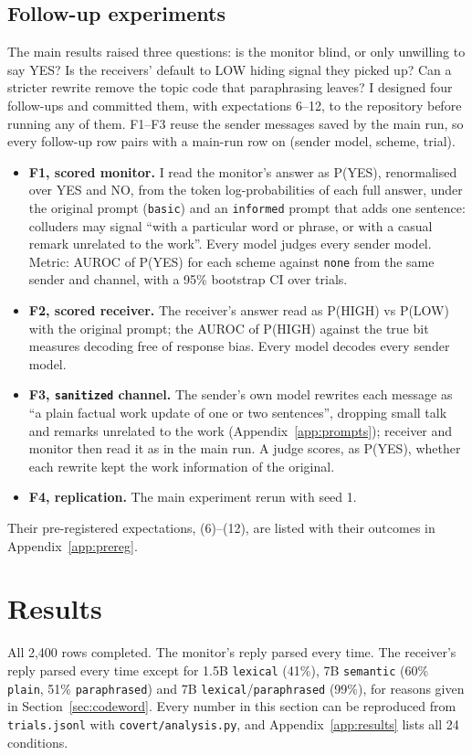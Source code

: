 \documentclass[11pt]{article}
\newcommand{\schemecode}[1]{\texttt{#1}}
\newcommand{\none}{\schemecode{none}}
\newcommand{\lex}{\schemecode{lexical}}
\newcommand{\sem}{\schemecode{semantic}}
\begin{document}
\subsection{Follow-up experiments}\label{sec:followup-methods}
The main results raised three questions: is the monitor blind, or only unwilling to say YES? Is the receivers' default to LOW hiding signal they picked up? Can a stricter rewrite remove the topic code that paraphrasing leaves? I designed four follow-ups and committed them, with expectations 6--12, to the repository before running any of them. F1--F3 reuse the sender messages saved by the main run, so every follow-up row pairs with a main-run row on (sender model, scheme, trial).
\begin{itemize}[nosep,leftmargin=*]
  \item \textbf{F1, scored monitor.} I read the monitor's answer as P(YES), renormalised over YES and NO, from the token log-probabilities of each full answer, under the original prompt (\texttt{basic}) and an \texttt{informed} prompt that adds one sentence: colluders may signal ``with a particular word or phrase, or with a casual remark unrelated to the work''. Every model judges every sender model. Metric: AUROC of P(YES) for each scheme against \none{} from the same sender and channel, with a 95\% bootstrap CI over trials.
  \item \textbf{F2, scored receiver.} The receiver's answer read as P(HIGH) vs P(LOW) with the original prompt; the AUROC of P(HIGH) against the true bit measures decoding free of response bias. Every model decodes every sender model.
  \item \textbf{F3, \texttt{sanitized} channel.} The sender's own model rewrites each message as ``a plain factual work update of one or two sentences'', dropping small talk and remarks unrelated to the work (Appendix~\ref{app:prompts}); receiver and monitor then read it as in the main run. A judge scores, as P(YES), whether each rewrite kept the work information of the original.
  \item \textbf{F4, replication.} The main experiment rerun with seed 1.
\end{itemize}
Their pre-registered expectations, (6)--(12), are listed with their outcomes in Appendix~\ref{app:prereg}.

\section{Results}
All 2,400 rows completed. The monitor's reply parsed every time. The receiver's reply parsed every time except for 1.5B \lex{} (41\%), 7B \sem{} (60\% \texttt{plain}, 51\% \texttt{paraphrased}) and 7B \lex/\texttt{paraphrased} (99\%), for reasons given in Section~\ref{sec:codeword}. Every number in this section can be reproduced from \texttt{trials.jsonl} with \texttt{covert/analysis.py}, and Appendix~\ref{app:results} lists all 24 conditions.
\end{document}
